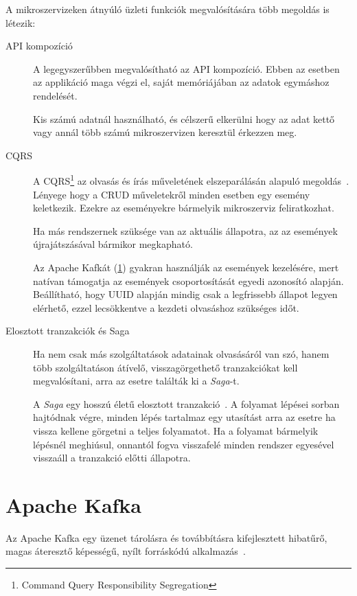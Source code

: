 A mikroszervizeken átnyúló üzleti funkciók megvalósítására több megoldás is létezik:
\begin{description}
	\item[API kompozíció] A legegyszerűbben megvalósítható az API kompozíció. Ebben az esetben az applikáció maga végzi el, saját memóriájában az adatok egymáshoz rendelését. 
	
	Kis számú adatnál használható, és célszerű elkerülni hogy az adat kettő vagy annál több számú mikroszervizen keresztül érkezzen meg.
	
	\item[CQRS] A CQRS\footnote{Command Query Responsibility Segregation} az  olvasás és írás műveletének elszeparálásán alapuló megoldás~\cite{OReally_Microservice_Architecture_CQRS}. Lényege hogy a CRUD műveletekről minden esetben egy esemény keletkezik. Ezekre az eseményekre bármelyik mikroszerviz feliratkozhat.
	
	Ha más rendszernek szüksége van az aktuális állapotra, az az események újrajátszásával bármikor megkapható.	
	 
	Az Apache Kafkát (\ref{sec:apache_kafka}) gyakran használják az események kezelésére, mert natívan támogatja az események csoportosítását egyedi azonosító alapján. Beállítható, hogy UUID alapján mindig csak a legfrissebb állapot legyen elérhető, ezzel lecsökkentve a kezdeti olvasáshoz szükséges időt.
		
	\item[Elosztott tranzakciók és Saga] Ha nem csak más szolgáltatások adatainak olvasásáról van szó, hanem több szolgáltatáson átívelő, visszagörgethető tranzakciókat kell megvalósítani, arra az esetre találták ki a \textit{Saga}-t.
	
	A \textit{Saga} egy hosszú életű elosztott tranzakció~\cite{OReally_Microservice_Architecture_Saga}. A folyamat lépései sorban hajtódnak végre, minden lépés tartalmaz egy utasítást arra az esetre ha vissza kellene görgetni a teljes folyamatot. Ha a folyamat bármelyik lépésnél meghiúsul, onnantól fogva visszafelé minden rendszer egyesével visszaáll a tranzakció előtti állapotra.
\end{description}


\section{Apache Kafka}\label{sec:apache_kafka}
Az Apache Kafka egy üzenet tárolásra és továbbításra kifejlesztett hibatűrő, magas áteresztő képességű, nyílt forráskódú alkalmazás~\cite{OReally_Kafka}.

